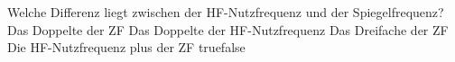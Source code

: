     {Welche Differenz liegt zwischen der HF-Nutzfrequenz und der Spiegelfrequenz?}
    {Das Doppelte der ZF}
    {Das Doppelte der HF-Nutzfrequenz}
    {Das Dreifache der ZF}
    {Die HF-Nutzfrequenz plus der ZF}
    {true}{false}